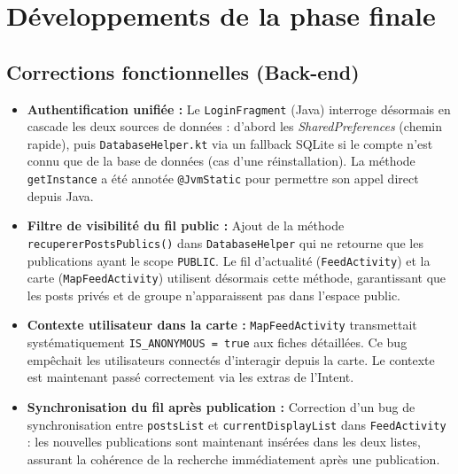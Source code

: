 \documentclass[11pt,a4paper]{article}
\begin{document}
\newpage

\section{Développements de la phase finale}

\subsection{Corrections fonctionnelles (Back-end)}
\begin{itemize}[label=\textcolor{primary}{\textbullet}]
    \item \textbf{Authentification unifiée :} Le \texttt{LoginFragment} (Java) interroge désormais en cascade les deux sources de données : d'abord les \textit{SharedPreferences} (chemin rapide), puis \texttt{DatabaseHelper.kt} via un fallback SQLite si le compte n'est connu que de la base de données (cas d'une réinstallation). La méthode \texttt{getInstance} a été annotée \texttt{@JvmStatic} pour permettre son appel direct depuis Java.
    
    \item \textbf{Filtre de visibilité du fil public :} Ajout de la méthode \texttt{recupererPostsPublics()} dans \texttt{DatabaseHelper} qui ne retourne que les publications ayant le scope \texttt{PUBLIC}. Le fil d'actualité (\texttt{FeedActivity}) et la carte (\texttt{MapFeedActivity}) utilisent désormais cette méthode, garantissant que les posts privés et de groupe n'apparaissent pas dans l'espace public.
    
    \item \textbf{Contexte utilisateur dans la carte :} \texttt{MapFeedActivity} transmettait systématiquement \texttt{IS\_ANONYMOUS = true} aux fiches détaillées. Ce bug empêchait les utilisateurs connectés d'interagir depuis la carte. Le contexte est maintenant passé correctement via les extras de l'Intent.
    
    \item \textbf{Synchronisation du fil après publication :} Correction d'un bug de synchronisation entre \texttt{postsList} et \texttt{currentDisplayList} dans \texttt{FeedActivity} : les nouvelles publications sont maintenant insérées dans les deux listes, assurant la cohérence de la recherche immédiatement après une publication.
\end{itemize}
\end{document}
